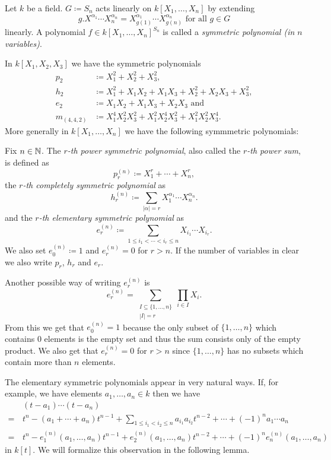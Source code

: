\begin{defi}
 Let $k$ be a field. $G \coloneqq S_n$ acts linearly on $k[X_1, \dotsc, X_n]$ by extending
 \[
  g.X^{\alpha_1} \dotsm X_n^{\alpha_n} = X_{g(1)}^{\alpha_1} \dotsm X_{g(n)}^{\alpha_n} \text{ for all } g \in G
 \]
 linearly. A polynomial $f \in k[X_1, \dotsc, X_n]^{S_n}$ is called a \emph{symmetric polynomial (in $n$ variables)}.
\end{defi}


\begin{expl}
 In $k[X_1, X_2, X_3]$ we have the symmetric polynomials
 \begin{align*}
  p_2 &\coloneqq X_1^2 + X_2^2 + X_3^2, \\
  h_2 &\coloneqq X_1^2 + X_1 X_2 + X_1 X_3 + X_2^2 + X_2 X_3 + X_3^2, \\
  e_2 &\coloneqq X_1 X_2 + X_1 X_3 + X_2 X_3 \text{ and} \\
  m_{(4,4,2)} &\coloneqq X_1^4 X_2^2 X_3^2 + X_1^2 X_2^4 X_3^2 + X_1^2 X_2^2 X_3^4.
 \end{align*}
 More generally in $k[X_1, \dotsc, X_n]$ we have the following symmmetric polynomials:
\end{expl}


\begin{defi}
 Fix $n \in \mathbb{N}$. The \emph{$r$-th power symmetric polynomial}, also called the \emph{$r$-th power sum}, is defined as
 \[
  p_r^{(n)} \coloneqq X_1^r + \dotsb + X_n^r,
 \]
 the \emph{$r$-th completely symmetric polynomial} as
 \[
  h_r^{(n)} \coloneqq \sum_{|\alpha|=r} X_1^{\alpha_1} \dotsm X_n^{\alpha_n}.
 \]
 and the \emph{$r$-th elementary symmetric polynomial} as
 \[
  e_r^{(n)} \coloneqq \sum_{1 \leq i_1 < \dotsb < i_r \leq n} X_{i_1} \dotsm X_{i_r}.
 \]
 We also set $e_0^{(n)} \coloneqq 1$ and $e_r^{(n)} = 0$ for $r > n$. If the number of variables in clear we also write $p_r$, $h_r$ and $e_r$.
\end{defi}

Another possible way of writing $e^{(n)}_r$ is
\[
 e^{(n)}_r = \sum_{\substack{I \subseteq \{1, \dotsc, n\} \\ |I| = r}} \prod_{i \in I} X_i.
\]
From this we get that $e^{(n)}_0 = 1$ because the only subset of $\{1, \dotsc, n\}$ which contains $0$ elements is the empty set and thus the sum consists only of the empty product. We also get that $e^{(n)}_r = 0$ for $r > n$ since $\{1, \dotsc, n\}$ has no subsets which contain more than $n$ elements.

The elementary symmetric polynomials appear in very natural ways. If, for example, we have elements $a_1, \dotsc, a_n \in k$ then we have
\begin{align*}
  &\, (t-a_1) \dotsm (t-a_n) \\
 =&\, t^n - (a_1 + \dotsb + a_n) t^{n-1} + \sum_{1 \leq i_1 < i_2 \leq n} a_{i_1} a_{i_2} t^{n-2} + \dotsb + (-1)^n a_1 \dotsm a_n \\ 
 =&\, t^n - e^{(n)}_1(a_1, \dotsc, a_n) t^{n-1} + e^{(n)}_2(a_1, \dotsc, a_n) t^{n-2} + \dotsb + (-1)^n e^{(n)}_n(a_1, \dotsc, a_n)
\end{align*}
in $k[t]$. We will formalize this observation in the following lemma.


